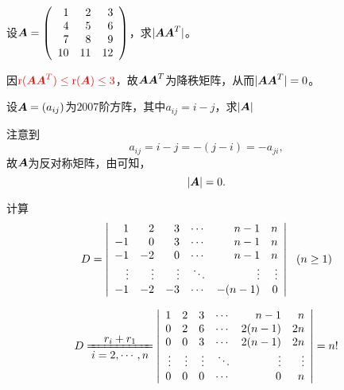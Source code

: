 \begin{frame}
  
    \begin{li}[2009－2010第二学期]
      设$\boldsymbol{A}=\left(
      \begin{array}{rrr}
        1&2&3\\
        4&5&6\\
        7&8&9\\
        10&11&12
      \end{array}
      \right)$，求$|\boldsymbol{A}\boldsymbol{A}^T|$。
    \end{li}
    \pause

    \begin{jie}
    因$\textcolor{red}{\mathrm{r}(\boldsymbol{A}\boldsymbol{A}^T)\le \mathrm{r}(\boldsymbol{A})\le 3}$，故$\boldsymbol{A}\boldsymbol{A}^T$为降秩矩阵，从而$|\boldsymbol{A}\boldsymbol{A}^T|=0$。
    \end{jie}
\end{frame}


\begin{frame}
  
    \begin{li}[2006－2007第一学期]
      设$\boldsymbol{A}=(a_{ij})$为$2007$阶方阵，其中$a_{ij}=i-j$，求$|\boldsymbol{A}|$
    \end{li}
    \pause
    \begin{jie}
    注意到
    $$
    a_{ij}=i-j=-(j-i)=-a_{ji},
    $$
    故$\boldsymbol{A}$为反对称矩阵，由可知，$$|\boldsymbol{A}|=0.$$
    \end{jie}
\end{frame}



\begin{frame}
  
    \begin{li}[2006－2007第二学期]
      计算
      $$
      D=\left|
      \begin{array}{rrrrrr}
        1&2&3&\cdots&n-1&n\\
        -1&0&3&\cdots&n-1&n\\
        -1&-2&0&\cdots&n-1&n\\
        \vdots&\vdots&\vdots&\ddots&\vdots&\vdots\\
        -1&-2&-3&\cdots&-(n-1)&0
      \end{array}
      \right|~~(n\ge 1)
      $$
    \end{li}
    \pause 
    \begin{jie}
    $$
    D\xlongequal[\ds i=2,\cd,n]{\ds r_i+r_1}\left|
      \begin{array}{rrrrrr}
        1&2&3&\cd&n-1&n\\
        0&2&6&\cd&2(n-1)&2n\\
        0&0&3&\cd&2(n-1)&2n\\
        \vd&\vd&\vd&\dd&\vd&\vd\\
        0&0&0&\cd&0&n
      \end{array}
      \right|=n!
    $$
    \end{jie}
\end{frame}

